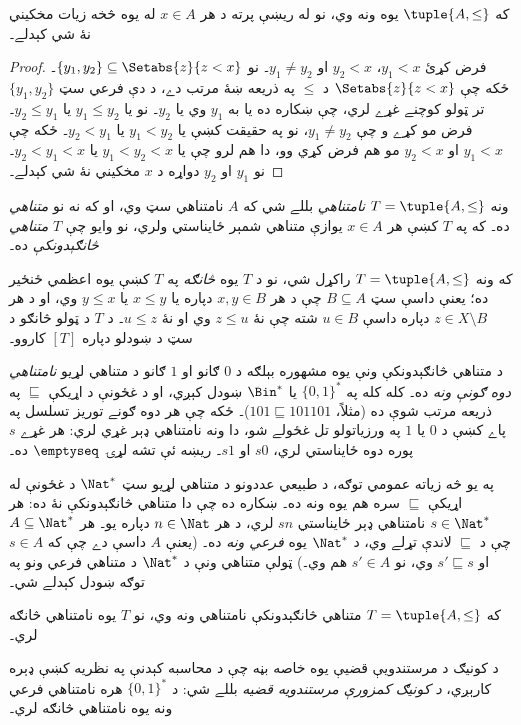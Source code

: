 \documentclass[../../../include/open-logic-section]{subfiles}
\begin{document}
\begin{prop}
که $\tuple{A,\le}$ يوه ونه وي، نو له ريښې پرته د هر $x \in A$
له يوه څخه زيات مخکيني نۀ شي کېدلے۔
\end{prop}

\begin{proof}
  فرض کړئ $y_1 < x$، $y_2 < x$ او $y_1 \neq y_2$۔ نو
  $\{y_1, y_2\} \subseteq \Setabs{z}{z<x}$۔ ځکه چې
  $\Setabs{z}{z<x}$ د $\le$ په ذريعه ښۀ مرتب دے، د دې فرعي سټ
  $\{y_1, y_2\}$ تر ټولو کوچنے غړے لري، چې ښکاره ده يا به $y_1$
  وي يا $y_2$۔ نو يا $y_1 \le y_2$ يا $y_2 \le y_1$۔ فرض مو
  کړے و چې $y_1 \neq y_2$، نو په حقيقت کښې يا $y_1 < y_2$ يا
  $y_2 < y_1$۔ ځکه چې $y_1 < x$ او $y_2 < x$ مو هم فرض کړي وو،
  دا هم لرو چې يا $y_1 < y_2 < x$ يا $y_2 < y_1 < x$۔ نو
  $y_1$ او $y_2$ دواړه د $x$ مخکيني نۀ شي کېدلے۔
\end{proof}

\begin{defn}
ونه $T = \tuple{A, \le}$ \emph{نامتناهي} بللے شي که $A$ نامتناهي
سټ وي، او که نه نو \emph{متناهي} ده۔ که په $T$ کښې هر $x \in A$
يوازې متناهي شمېر ځايناستي ولري، نو وايو چې $T$
\emph{متناهي څانګېدونکې} ده۔
\end{defn}

\begin{defn}[څانګې]
که ونه $T = \tuple{A, \le}$ راکړل شي، نو د $T$ يوه \emph{څانګه}
په $T$ کښې يوه اعظمي ځنځير ده؛ يعنې داسې سټ $B \subseteq A$ چې
د هر $x, y \in B$ دپاره يا $x \le y$ يا $y \le x$ وي، او د
هر $z \in X \setminus B$ دپاره داسې $u \in B$ شته چې نۀ
$z \le u$ وي او نۀ $u \le z$۔
%
د $T$ د ټولو څانګو د سټ د ښودلو دپاره $[T]$ کاروو۔
\end{defn}

\begin{ex}
د متناهي څانګېدونکې ونې يوه مشهوره بېلګه د $0$ ګانو او $1$ ګانو
د متناهي لړيو \emph{نامتناهي دوه ګونې ونه} ده۔ کله کله په
$\{0,1\}^*$ يا $\Bin^*$ ښودل کېږي، او د غځونې د اړيکې
$\sqsubseteq$ په ذريعه مرتب شوې ده (مثلاً، $101 \sqsubseteq 101101$)۔
ځکه چې هر دوه ګونے توريز تسلسل په پاے کښې د $0$ يا $1$ په
ورزياتولو تل غځولے شو، دا ونه نامتناهي ډېر غړي لري: هر غړے $s$
پوره دوه ځايناستي لري، $s0$ او $s1$۔ ريښه ئې تشه لړۍ $\emptyseq$ ده۔
\end{ex}

\begin{ex}
په يو څه زياته عمومي توګه، د طبيعي عددونو د متناهي لړيو سټ
$\Nat^*$ د غځونې له اړيکې $\sqsubseteq$ سره هم يوه ونه ده۔
ښکاره ده چې دا متناهي څانګېدونکې نۀ ده: هر $s \in \Nat^*$
نامتناهي ډېر ځايناستي $sn$ لري، د هر $n \in \Nat$ دپاره يو۔
هر $A \subseteq \Nat^*$ چې د $\sqsubseteq$ لاندې تړلے وي، د
$\Nat^*$ يوه \emph{فرعي ونه} ده۔ (يعنې $A$ داسې دے چې که
$s \in A$ او $s' \sqsubseteq s$ وي، نو $s' \in A$ هم وي۔)
ټولې متناهي ونې د $\Nat^*$ د متناهي فرعي ونو په توګه ښودل کېدلے شي۔
\end{ex}

\begin{prop}
که $T = \tuple{A,\le}$ متناهي څانګېدونکې نامتناهي ونه وي، نو
$T$ يوه نامتناهي څانګه لري۔
\end{prop}

د کونيګ د مرستندويې قضيې يوه خاصه بڼه چې د محاسبه کېدنې په نظريه
کښې ډېره کارېږي، \emph{د کونيګ کمزورې مرستندويه قضيه} بللے شي:
د $\{0,1\}^*$ هره نامتناهي فرعي ونه يوه نامتناهي څانګه لري۔
\end{document}
